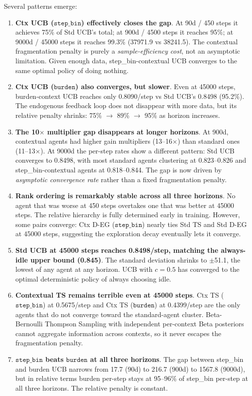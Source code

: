 \documentclass[11pt]{article}
\begin{document}
Several patterns emerge:

\begin{enumerate}
  \item \textbf{Ctx UCB ($\texttt{step\_bin}$) effectively closes the gap}. At 90d / 450 steps it achieves 75\% of Std UCB's total; at 900d / 4500 steps it reaches 95\%; at 9000d / 45000 steps it reaches 99.3\% (37971.9 vs 38241.5). The contextual fragmentation penalty is purely a \emph{sample-efficiency cost}, not an asymptotic limitation. Given enough data, step\_bin-contextual UCB converges to the same optimal policy of doing nothing.

  \item \textbf{Ctx UCB ($\texttt{burden}$) also converges, but slower}. Even at 45000 steps, burden-context UCB reaches only 0.8090/step vs Std UCB's 0.8498 (95.2\%). The endogenous feedback loop does not disappear with more data, but its relative penalty shrinks: 75\% $\to$ 89\% $\to$ 95\% as horizon increases.

  \item \textbf{The 10$\times$ multiplier gap disappears at longer horizons}. At 900d, contextual agents had higher gain multipliers (13--16$\times$) than standard ones (11--13$\times$). At 9000d the per-step rates show a different pattern: Std UCB converges to 0.8498, with most standard agents clustering at 0.823--0.826 and step\_bin-contextual agents at 0.818--0.844. The gap is now driven by \emph{asymptotic convergence rate} rather than a fixed fragmentation penalty.

  \item \textbf{Rank ordering is remarkably stable across all three horizons}. No agent that was worse at 450 steps overtakes one that was better at 45000 steps. The relative hierarchy is fully determined early in training. However, some pairs converge: Ctx D-EG ($\texttt{step\_bin}$) nearly ties Std TS and Std D-EG at 45000 steps, suggesting the exploration decay eventually lets it converge.

  \item \textbf{Std UCB at 45000 steps reaches 0.8498/step, matching the always-idle upper bound (0.845)}. The standard deviation shrinks to $\pm$51.1, the lowest of any agent at any horizon. UCB with $c=0.5$ has converged to the optimal deterministic policy of always choosing idle.

  \item \textbf{Contextual TS remains terrible even at 45000 steps}. Ctx TS ($\texttt{step\_bin}$) at 0.5675/step and Ctx TS ($\texttt{burden}$) at 0.4399/step are the only agents that do not converge toward the standard-agent cluster. Beta-Bernoulli Thompson Sampling with independent per-context Beta posteriors cannot aggregate information across contexts, so it never escapes the fragmentation penalty.

  \item \textbf{$\texttt{step\_bin}$ beats $\texttt{burden}$ at all three horizons}. The gap between step\_bin and burden UCB narrows from 17.7 (90d) to 216.7 (900d) to 1567.8 (9000d), but in relative terms burden per-step stays at 95--96\% of step\_bin per-step at all three horizons. The relative penalty is constant.
\end{enumerate}
\end{document}
